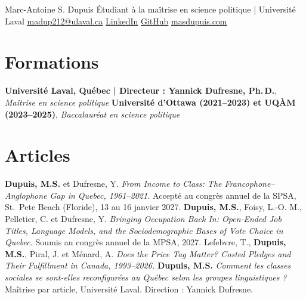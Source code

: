 \documentclass[10pt,letterpaper]{article}
\begin{document}
\cvheader
  {Marc-Antoine S. Dupuis}
  {Étudiant à la maîtrise en science politique | Université Laval}
  {\href{mailto:madup212@ulaval.ca}{madup212@ulaval.ca}\cvsep
   \href{https://www.linkedin.com/in/marc-antoine-dupuis-a6a069233/}{LinkedIn}\cvsep
   \href{https://github.com/MADUP212}{GitHub}\cvsep
   \href{https://www.masdupuis.com/fr/}{masdupuis.com}}

\section*{Formations}
  {\textbf{Université Laval, Québec | Directeur : Yannick Dufresne, Ph.\,D.}, \textit{Maîtrise en science politique}}{}
  {\textbf{Université d'Ottawa (2021--2023) et UQÀM (2023--2025)}, \textit{Baccalauréat en science politique}}{}

\section*{Articles}
  {\textbf{Dupuis, M.S.} et Dufresne, Y. \foreignlanguage{english}{\textit{From Income to Class: The Francophone--Anglophone Gap
   in Quebec, 1961--2021.}}}
  {Accepté au congrès annuel de la SPSA, St.\ Pete Beach (Floride), 13 au 16 janvier 2027.}
  {\textbf{Dupuis, M.S.}, Foisy, L.-O. M., Pelletier, C. et Dufresne, Y. \foreignlanguage{english}{\textit{Bringing Occupation
   Back In: Open-Ended Job Titles, Language Models, and the Sociodemographic Bases of Vote Choice in Quebec.}}}
  {Soumis au congrès annuel de la MPSA, 2027.}
  {Lefebvre, T., \textbf{Dupuis, M.S.}, Piral, J. et Ménard, A. \foreignlanguage{english}{\textit{Does the Price Tag Matter?
   Costed Pledges and Their Fulfillment in Canada, 1993--2026.}}}{}
  {\textbf{Dupuis, M.S.} \textit{Comment les classes sociales se sont-elles reconfigurées au Québec selon
   les groupes linguistiques ?}}
  {Maîtrise par article, Université Laval. Direction : Yannick Dufresne.}
\end{document}
